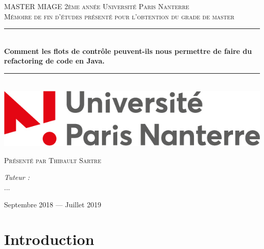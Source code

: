 \documentclass[a4paper,twoside,12pt,openright]{report}
\newcommand{\HRule}{\rule{\linewidth}{0.5mm}}
\begin{document}
\begin{titlepage}
  \begin{sffamily}
  \begin{center}

    \textsc{\LARGE MASTER MIAGE 2ème année \linebreak Université Paris Nanterre}\\[2cm]

    \textsc{\Large Mémoire de fin d’études présenté pour l’obtention du grade de master}\\[1.5cm]

    \HRule \\[0.4cm]
    { \huge \bfseries Comment les flots de contrôle peuvent-ils nous permettre de faire du refactoring de code en Java. \\[0.4cm] }

    \HRule \\[2cm]
    \includegraphics[scale=0.40]{image/univ.jpg}
    \hspace{2cm}
    
    \vfill
  \begin{minipage}{0.4\textwidth}
      \begin{flushleft} \large
        \textsc{Présenté par Thibault Sartre}\\
      \end{flushleft}
    \end{minipage}
    \begin{minipage}{0.4\textwidth}
      \begin{flushright} \large
        \emph{Tuteur :}\\ \textsc{...}\\
      \end{flushright}
    \end{minipage}
    \vfill
    {\large Septembre 2018 — Juillet 2019}
  \end{center}
  \end{sffamily}
\end{titlepage}
\renewcommand{\contentsname}{Sommaire}
\tableofcontents{}
\chapter{Introduction}
\end{document}
